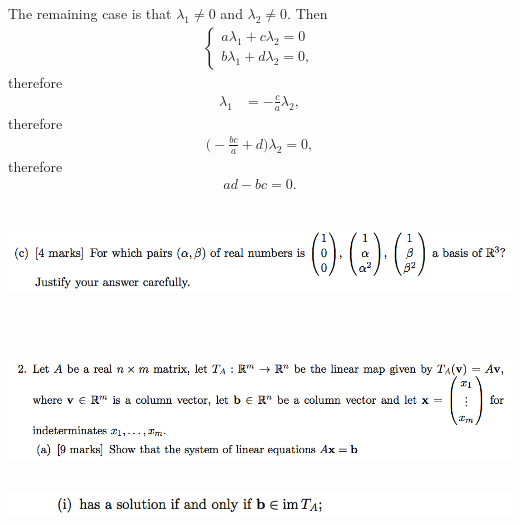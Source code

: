 \documentclass[12pt]{article}
\begin{document}
The remaining case is that $\lambda_1 \neq 0$ and $\lambda_2 \neq 0$. Then
\begin{align*}
  \begin{cases}
    a\lambda_1 + c\lambda_2 = 0\\
    b\lambda_1 + d\lambda_2 = 0,
  \end{cases}
\end{align*}
therefore
\begin{align*}
\lambda_1 &= -\frac{c}{a}\lambda_2,
\end{align*}
therefore
\begin{align*}
  \Big(-\frac{bc}{a} + d\Big)\lambda_2 = 0,
\end{align*}
therefore
\begin{align*}
  ad - bc = 0.
\end{align*}
~\\
\newpage
\begin{mdframed}
\includegraphics[width=400pt]{img/oxford-prelims-2017-A-1-3.png}
\end{mdframed}

~\\
\subsection*{}  %
\begin{mdframed}
\includegraphics[width=400pt]{img/oxford-prelims-2017-A-2-1.png}
\end{mdframed}

\subsection*{}  %
\begin{mdframed}
\includegraphics[width=400pt]{img/oxford-prelims-2017-A-2-1-1.png}
\end{mdframed}
\end{document}
